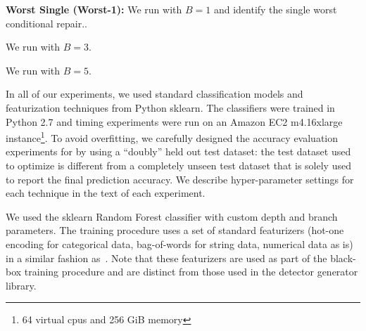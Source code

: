 \vspace{0.25em}\noindent\textbf{Worst Single (Worst-1): } We run \sys with $B=1$ and identify the single worst conditional repair..

 We run \sys with $B=3$.

 We run \sys with $B=5$.


\vspace{0.25em}



In all of our experiments, we used standard classification models and featurization techniques from Python \textsf{sklearn}.
The classifiers were trained in Python 2.7 and timing experiments were run on an Amazon EC2 m4.16xlarge instance\footnote{64 virtual cpus and 256 GiB memory}.
To avoid overfitting, we carefully designed the accuracy evaluation experiments for \sys by using a ``doubly'' held out test dataset: the test dataset used to optimize \sys is different from a completely unseen test dataset that is solely used to report the final prediction accuracy.
We describe hyper-parameter settings for each technique in the text of each experiment.

We used the \textsf{sklearn} Random Forest classifier with custom depth and branch parameters.  The training procedure uses a set of standard featurizers (hot-one encoding for categorical data, bag-of-words for string data, numerical data as is) in a similar fashion as~\cite{DBLP:conf/sigmod/GokhaleDDNRSZ14}.  Note that these featurizers are used as part of the black-box training procedure and are distinct from those used in the detector generator library.

